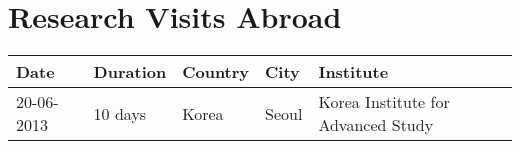 \documentclass{report}
\begin{document}
\section*{Research Visits Abroad}

\begin{tabular}{p{2.0cm} p{1.5cm} p{1.5cm} p{1.5cm} p{5.5cm}}\hline
Date & Duration & Country & City & Institute\\\hline
20-06-2013 & 10 days & Korea & Seoul & Korea Institute for Advanced Study
\end{tabular}
\end{document}
